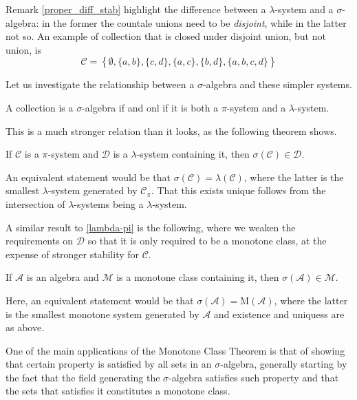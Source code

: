 \begin{my_remark}
	Remark \ref{proper_diff_stab} highlight the difference between a $\lambda$-system and a $\sigma$-algebra: in the former the countale unions need to be \textit{disjoint}, while in the latter not so. An example of collection that is closed under disjoint union, but not union, is
	\[
		\mathcal{C}=\left \{ \emptyset, \{a,b\},\{c,d\},\{a,c\},\{b,d\}, \{a,b,c,d\} \right \}
	\]
\end{my_remark}
Let us investigate the relationship between a $\sigma$-algebra and these simpler systems. 
\begin{my_lemma}
	A collection is a $\sigma$-algebra if and onl if it is both a $\pi$-system and a $\lambda$-system.	
\end{my_lemma}
This is a much stronger relation than it looks, as the following theorem shows.
\begin{my_theorem}
	\label{lambda-pi}
	If $\mathcal{C}$ is a $\pi$-system and $\mathcal{D}$ is a $\lambda$-system containing it, then $\sigma(\mathcal{C}) \in \mathcal{D}$.
\end{my_theorem}
\begin{my_remark}
	An equivalent statement would be that $\sigma(\mathcal{C}) = \lambda(\mathcal{C})$, where the latter is the smallest $\lambda$-system generated by $\mathcal{C}_\pi$. That this exists unique follows from the intersection of $\lambda$-systems being a $\lambda$-system.
\end{my_remark}
A similar result to \ref{lambda-pi} is the following, where we weaken the requirements on $\mathcal{D}$ so that it is only required to be a monotone class, at the expense of stronger stability for $\mathcal{C}$.
\begin{my_theorem}
	\label{mct}
	If $\mathcal{A}$ is an algebra and $\mathcal{M}$ is a monotone class containing it, then $\sigma(\mathcal{A}) \in \mathcal{M}$.	
\end{my_theorem}
\begin{my_remark}
	Here, an equivalent statement would be that $ \sigma \left( \mathcal{A} \right) = \mathrm{M} \left( \mathcal{A} \right) $, where the latter is the smallest monotone system generated by $\mathcal{A}$ and existence and uniquess are as above.
\end{my_remark}
\begin{my_remark}
	One of the main applications of the Monotone Class Theorem is that of showing that certain property is satisfied by all sets in an $\sigma$-algebra, generally starting by the fact that the field generating the $\sigma$-algebra satisfies such property and that the sets that satisfies it constitutes a monotone class.
\end{my_remark}
